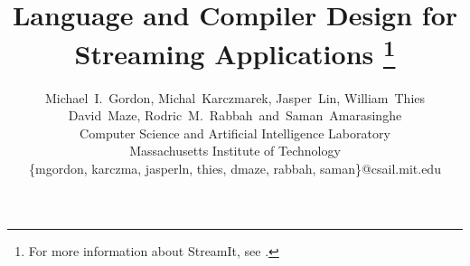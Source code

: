 \documentclass[10pt]{article}
\begin{document}
\title{Language and Compiler Design for Streaming Applications%
\thanks{For more information about StreamIt, see \streamiturl.}}

\author{Michael~I.~Gordon, Michal~Karczmarek, Jasper~Lin, William~Thies\\
 David~Maze, Rodric~M.~Rabbah~and~Saman~Amarasinghe\\
 Computer Science and Artificial Intelligence Laboratory\\
 Massachusetts Institute of Technology\\
 \{mgordon, karczma, jasperln, thies, dmaze, rabbah, saman\}@csail.mit.edu}

\maketitle
\thispagestyle{empty}


\begin{abstract}

\end{abstract}
\end{document}
